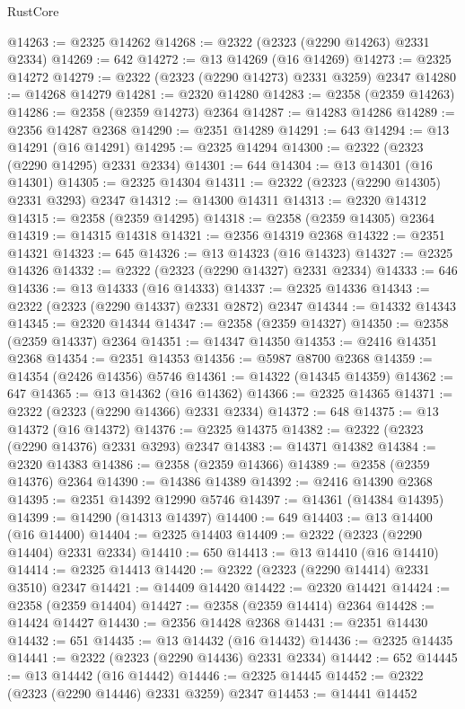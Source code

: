 \begin{lexlean}{RustCore}
\begin{coremodule}
@14263 := @2325 @14262
@14268 := @2322 (@2323 (@2290 @14263) @2331 @2334)
@14269 := 642
@14272 := @13 @14269 (@16 @14269)
@14273 := @2325 @14272
@14279 := @2322 (@2323 (@2290 @14273) @2331 @3259) @2347
@14280 := @14268 @14279
@14281 := @2320 @14280
@14283 := @2358 (@2359 @14263)
@14286 := @2358 (@2359 @14273) @2364
@14287 := @14283 @14286
@14289 := @2356 @14287 @2368
@14290 := @2351 @14289
@14291 := 643
@14294 := @13 @14291 (@16 @14291)
@14295 := @2325 @14294
@14300 := @2322 (@2323 (@2290 @14295) @2331 @2334)
@14301 := 644
@14304 := @13 @14301 (@16 @14301)
@14305 := @2325 @14304
@14311 := @2322 (@2323 (@2290 @14305) @2331 @3293) @2347
@14312 := @14300 @14311
@14313 := @2320 @14312
@14315 := @2358 (@2359 @14295)
@14318 := @2358 (@2359 @14305) @2364
@14319 := @14315 @14318
@14321 := @2356 @14319 @2368
@14322 := @2351 @14321
@14323 := 645
@14326 := @13 @14323 (@16 @14323)
@14327 := @2325 @14326
@14332 := @2322 (@2323 (@2290 @14327) @2331 @2334)
@14333 := 646
@14336 := @13 @14333 (@16 @14333)
@14337 := @2325 @14336
@14343 := @2322 (@2323 (@2290 @14337) @2331 @2872) @2347
@14344 := @14332 @14343
@14345 := @2320 @14344
@14347 := @2358 (@2359 @14327)
@14350 := @2358 (@2359 @14337) @2364
@14351 := @14347 @14350
@14353 := @2416 @14351 @2368
@14354 := @2351 @14353
@14356 := @5987 @8700 @2368
@14359 := @14354 (@2426 @14356) @5746
@14361 := @14322 (@14345 @14359)
@14362 := 647
@14365 := @13 @14362 (@16 @14362)
@14366 := @2325 @14365
@14371 := @2322 (@2323 (@2290 @14366) @2331 @2334)
@14372 := 648
@14375 := @13 @14372 (@16 @14372)
@14376 := @2325 @14375
@14382 := @2322 (@2323 (@2290 @14376) @2331 @3293) @2347
@14383 := @14371 @14382
@14384 := @2320 @14383
@14386 := @2358 (@2359 @14366)
@14389 := @2358 (@2359 @14376) @2364
@14390 := @14386 @14389
@14392 := @2416 @14390 @2368
@14395 := @2351 @14392 @12990 @5746
@14397 := @14361 (@14384 @14395)
@14399 := @14290 (@14313 @14397)
@14400 := 649
@14403 := @13 @14400 (@16 @14400)
@14404 := @2325 @14403
@14409 := @2322 (@2323 (@2290 @14404) @2331 @2334)
@14410 := 650
@14413 := @13 @14410 (@16 @14410)
@14414 := @2325 @14413
@14420 := @2322 (@2323 (@2290 @14414) @2331 @3510) @2347
@14421 := @14409 @14420
@14422 := @2320 @14421
@14424 := @2358 (@2359 @14404)
@14427 := @2358 (@2359 @14414) @2364
@14428 := @14424 @14427
@14430 := @2356 @14428 @2368
@14431 := @2351 @14430
@14432 := 651
@14435 := @13 @14432 (@16 @14432)
@14436 := @2325 @14435
@14441 := @2322 (@2323 (@2290 @14436) @2331 @2334)
@14442 := 652
@14445 := @13 @14442 (@16 @14442)
@14446 := @2325 @14445
@14452 := @2322 (@2323 (@2290 @14446) @2331 @3259) @2347
@14453 := @14441 @14452

\end{coremodule}
\end{lexlean}

